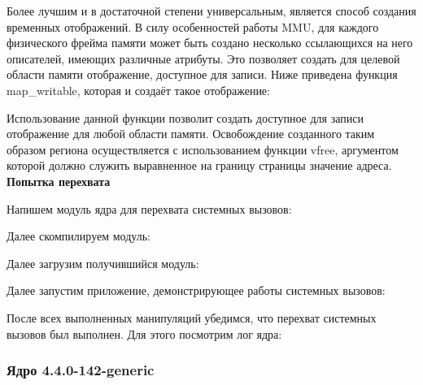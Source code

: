 \par Более лучшим и в достаточной степени универсальным, является способ создания временных отображений. В силу особенностей работы MMU, для каждого физического фрейма памяти может быть создано несколько ссылающихся на него описателей, имеющих различные атрибуты. Это позволяет создать для целевой области памяти отображение, доступное для записи. Ниже приведена функция map\_writable, которая и создаёт такое отображение:

\clearpage



\par Использование данной функции позволит создать доступное для записи отображение для любой области памяти. Освобождение созданного таким образом региона осуществляется с использованием функции vfree, аргументом которой должно служить выравненное на границу страницы значение адреса.\\

\textbf{Попытка перехвата}

\par Напишем модуль ядра для перехвата системных вызовов:



\par Далее скомпилируем модуль:



\par Далее загрузим получившийся модуль:



\par Далее запустим приложение, демонстрирующее работы системных вызовов:




\par После всех выполненных манипуляций убедимся, что перехват системных вызовов был выполнен. Для этого посмотрим лог ядра:







\subsubsection{Ядро 4.4.0-142-generic} %

